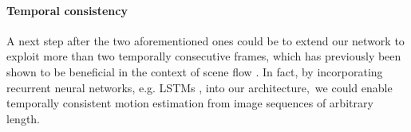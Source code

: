\paragraph{Temporal consistency}
A next step after the two aforementioned ones could be to extend our network to exploit more than two
temporally consecutive frames, which has previously been shown to be beneficial in the
context of scene flow \cite{TemporalSF}.
In fact, by incorporating recurrent neural networks, e.g. LSTMs \cite{LSTM},
into our architecture, we could enable temporally consistent motion estimation 
from image sequences of arbitrary length. 
